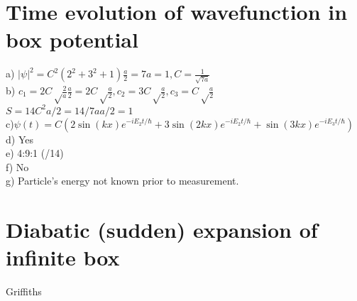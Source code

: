 \documentclass{article}
\title{}
\date{}
\newcommand{\<}{\langle}
\renewcommand{\>}{\rangle}
\begin{document}
\maketitle

\section{Time evolution of wavefunction in box potential}

a) $|\psi|^2 = C^2 (2^2 + 3^2 + 1)\frac{a}{2} = 7a = 1, C = \frac{1}{\sqrt{7a}}$
\\
b) $c_1 = 2C\sqrt\frac{2}{a} \frac{a}{2} = 2C\sqrt\frac{a}{2}, c_2 = 3C\sqrt\frac{a}{2}, c_3 = C\sqrt\frac{a}{2}$
\\
$S = 14C^2 a/2 = 14/7a a/2 = 1$
\\
c)$\psi(t) = C(2\sin(kx)e^{-iE_2t/\hbar} + 3\sin(2kx)e^{-iE_2t/\hbar} + \sin(3kx)e^{-iE_3t/\hbar})$
\\
d) Yes
\\
e) 4:9:1 (/14)
\\
f) No
\\
g) Particle's energy not known prior to measurement.

\section{Diabatic (sudden) expansion of infinite box}

Griffiths
\end{document}
